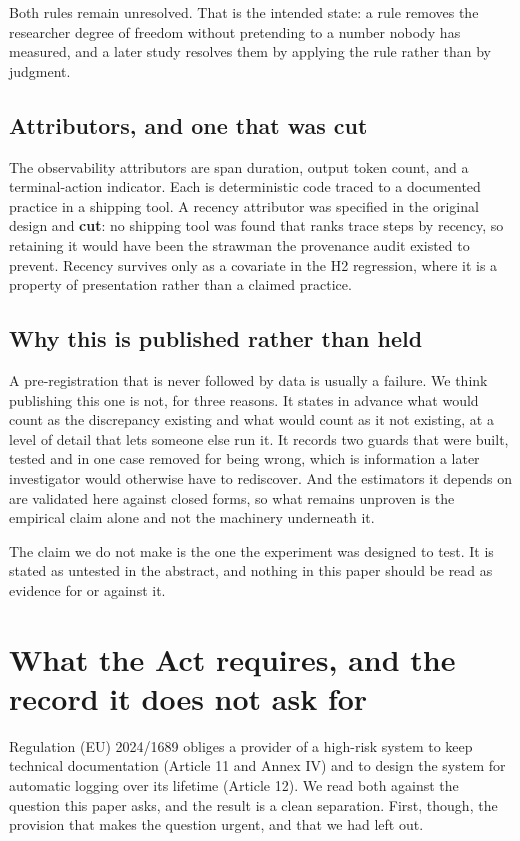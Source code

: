 \documentclass[11pt]{article}
\theoremstyle{remark}
\begin{document}
Both rules remain unresolved. That is the intended state: a rule removes the
researcher degree of freedom without pretending to a number nobody has measured,
and a later study resolves them by applying the rule rather than by judgment.

\subsection{Attributors, and one that was cut}

The observability attributors are span duration, output token count, and a
terminal-action indicator. Each is deterministic code traced to a documented
practice in a shipping tool. A recency attributor was specified in the original
design and \textbf{cut}: no shipping tool was found that ranks trace steps by
recency, so retaining it would have been the strawman the provenance audit
existed to prevent. Recency survives only as a covariate in the H2 regression,
where it is a property of presentation rather than a claimed practice.

\subsection{Why this is published rather than held}

A pre-registration that is never followed by data is usually a failure. We think
publishing this one is not, for three reasons. It states in advance what would
count as the discrepancy existing and what would count as it not existing, at a
level of detail that lets someone else run it. It records two guards that were
built, tested and in one case removed for being wrong, which is information a
later investigator would otherwise have to rediscover. And the estimators it
depends on are validated here against closed forms, so what remains unproven is
the empirical claim alone and not the machinery underneath it.

The claim we do not make is the one the experiment was designed to test. It is
stated as untested in the abstract, and nothing in this paper should be read as
evidence for or against it.

\section{What the Act requires, and the record it does not ask for}
\label{sec:annexiv}

Regulation (EU) 2024/1689 obliges a provider of a high-risk system to keep
technical documentation (Article 11 and Annex IV) and to design the system for
automatic logging over its lifetime (Article 12). We read both against the
question this paper asks, and the result is a clean separation. First, though,
the provision that makes the question urgent, and that we had left out.
\end{document}
